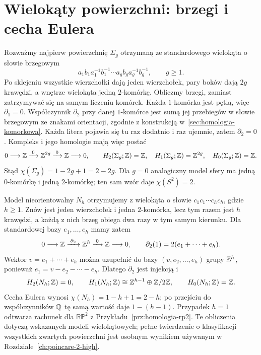 \section{Wielokąty powierzchni: brzegi i cecha Eulera}
\label{sec:app-euler-powierzchnie}

Rozważmy najpierw powierzchnię $\Sigma_g$ otrzymaną ze standardowego
wielokąta o słowie brzegowym
\[
 a_1b_1a_1^{-1}b_1^{-1}\cdots
 a_gb_ga_g^{-1}b_g^{-1},\qquad g\geq1.
\]
Po sklejeniu wszystkie wierzchołki dają jeden wierzchołek,
pary boków dają $2g$ krawędzi, a wnętrze wielokąta jedną
$2$-komórkę. Obliczmy brzegi, zamiast zatrzymywać się na samym
liczeniu komórek. Każda $1$-komórka jest pętlą, więc
$\partial_1=0$. Współczynnik $\partial_2$ przy danej
$1$-komórce jest sumą jej przebiegów w słowie brzegowym ze znakami
orientacji, zgodnie z konstrukcją w~\ref{sec:homologia-komorkowa}.
Każda litera pojawia się tu raz dodatnio i raz ujemnie, zatem
$\partial_2=0$. Kompleks i jego homologie mają więc postać
\[
 0\longrightarrow\mathbb{Z}\xrightarrow{\;0\;}\mathbb{Z}^{2g}
 \xrightarrow{\;0\;}\mathbb{Z}\longrightarrow0,
 \qquad
 H_2(\Sigma_g;\mathbb{Z})=\mathbb{Z},\quad
 H_1(\Sigma_g;\mathbb{Z})=\mathbb{Z}^{2g},\quad
 H_0(\Sigma_g;\mathbb{Z})=\mathbb{Z}.
\]
Stąd $\chi(\Sigma_g)=1-2g+1=2-2g$.
Dla $g=0$ analogiczny model sfery ma jedną $0$-komórkę
i jedną $2$-komórkę; ten sam wzór daje $\chi(S^2)=2$.

Model nieorientowalny $N_h$ otrzymujemy z wielokąta o słowie
$c_1c_1\cdots c_hc_h$, gdzie $h\geq1$.
Znów jest jeden wierzchołek i jedna $2$-komórka, lecz tym razem
jest $h$ krawędzi, a każdą z nich brzeg obiega dwa razy w tym samym
kierunku. Dla standardowej bazy $e_1,\ldots,e_h$ mamy zatem
\[
 0\longrightarrow\mathbb{Z}\xrightarrow{\;\partial_2\;}\mathbb{Z}^h
 \xrightarrow{\;0\;}\mathbb{Z}\longrightarrow0,
 \qquad \partial_2(1)=2(e_1+\cdots+e_h).
\]
Wektor $v=e_1+\cdots+e_h$ można uzupełnić do bazy
$(v,e_2,\ldots,e_h)$ grupy $\mathbb{Z}^h$, ponieważ
$e_1=v-e_2-\cdots-e_h$.
Dlatego $\partial_2$ jest injekcją i
\[
 H_2(N_h;\mathbb{Z})=0,\qquad
 H_1(N_h;\mathbb{Z})\cong\mathbb{Z}^{h-1}\oplus\mathbb{Z}/2\mathbb{Z},\qquad
 H_0(N_h;\mathbb{Z})=\mathbb{Z}.
\]
Cecha Eulera wynosi $\chi(N_h)=1-h+1=2-h$;
po przejściu do współczynników $\mathbb{Q}$ tę samą wartość daje
$1-(h-1)$. Przypadek $h=1$ odtwarza rachunek dla
$\mathbb{RP}^2$ z Przykładu~\ref{prz:homologia-rp2}.
Te obliczenia dotyczą wskazanych modeli wielokątowych; pełne
twierdzenie o klasyfikacji wszystkich zwartych powierzchni
jest osobnym wynikiem używanym w Rozdziale~\ref{ch:poincare-2-high}.
